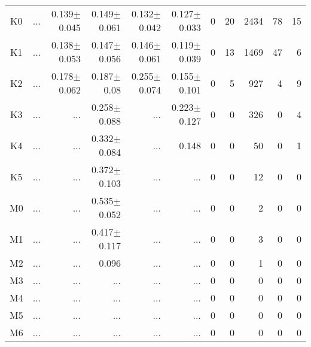 \begin{table}[t]
\begin{center}
\begin{tabular}{c|rrrrr|rrrrr}
K0	&	 ...	&	0.139$\pm$0.045	&	0.149$\pm$0.061	&	0.132$\pm$0.042	&	0.127$\pm$0.033	&	0	&	20	&	2434	&	78	&	15	\\
K1	&	 ...	&	0.138$\pm$0.053	&	0.147$\pm$0.056	&	0.146$\pm$0.061	&	0.119$\pm$0.039	&	0	&	13	&	1469	&	47	&	6	\\
K2	&	 ...	&	0.178$\pm$0.062	&	0.187$\pm$0.08	&	0.255$\pm$0.074	&	0.155$\pm$0.101	&	0	&	5	&	927	&	4	&	9	\\
K3	&	 ...	&	 ...	&	0.258$\pm$0.088	&	 ...	&	0.223$\pm$0.127	&	0	&	0	&	326	&	0	&	4	\\
K4	&	 ...	&	 ...	&	0.332$\pm$0.084	&	 ...	&	0.148	&	0	&	0	&	50	&	0	&	1	\\
K5	&	 ...	&	 ...	&	0.372$\pm$0.103	&	 ...	&	 ...	&	0	&	0	&	12	&	0	&	0	\\
M0	&	 ...	&	 ...	&	0.535$\pm$0.052	&	 ...	&	 ...	&	0	&	0	&	2	&	0	&	0	\\
M1	&	 ...	&	 ...	&	0.417$\pm$0.117	&	 ...	&	 ...	&	0	&	0	&	3	&	0	&	0	\\
M2	&	 ...	&	 ...	&	0.096	&	 ...	&	 ...	&	0	&	0	&	1	&	0	&	0	\\
M3	&	 ...	&	 ...	&	 ...	&	 ...	&	 ...	&	0	&	0	&	0	&	0	&	0	\\
M4	&	 ...	&	 ...	&	 ...	&	 ...	&	 ...	&	0	&	0	&	0	&	0	&	0	\\
M5	&	 ...	&	 ...	&	 ...	&	 ...	&	 ...	&	0	&	0	&	0	&	0	&	0	\\
M6	&	 ...	&	 ...	&	 ...	&	 ...	&	 ...	&	0	&	0	&	0	&	0	&	0	\\
    \bottomrule
    \end{tabular}
\end{center}
\end{table}

